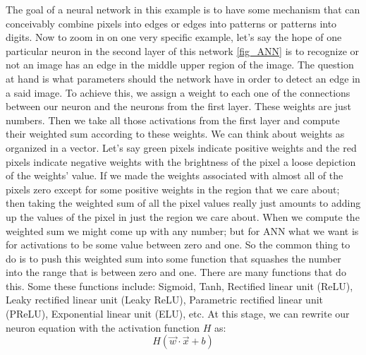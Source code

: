 \documentclass[master]{thesis-uestc}
\begin{document}
The goal of a neural network in this example is to have some mechanism that can conceivably combine pixels into edges or edges into patterns or patterns into digits. Now to zoom in on one very specific example, let's say the hope of one particular neuron in the second layer of this network \ref{fig_ANN} is to recognize or not an image has an edge in the middle upper region of the image. The question at hand is what parameters should the network have in order to detect an edge in a said image. To achieve this, we assign a weight to each one of the connections between our neuron and the neurons from the first layer. These weights are just numbers. Then we take all those activations from the first layer and compute their weighted sum according to these weights. We can think about weights as organized in a vector. Let's say green pixels indicate positive weights and the red pixels indicate negative weights with the brightness of the pixel a loose depiction of the weights’ value. If we made the weights associated with almost all of the pixels zero except for some positive weights in the region that we care about; then taking the weighted sum of all the pixel values really just amounts to adding up the values of the pixel in just the region we care about. When we compute the weighted sum we might come up with any number; but for ANN what we want is for activations to be some value between zero and one. So the common thing to do is to push this weighted sum into some function that squashes the number into the range that is between zero and one. There are many functions that do this. Some these functions include: Sigmoid, Tanh, Rectified linear unit (ReLU), Leaky rectified linear unit (Leaky ReLU), Parametric rectified linear unit (PReLU), Exponential linear unit (ELU), etc. At this stage, we can rewrite our neuron equation with the activation function $H$ as:
\begin{equation}
    H(\vec{w} \cdot \vec{x} + b)
\end{equation}
\end{document}
